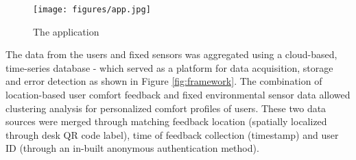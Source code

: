 \documentclass[]{interact}
\theoremstyle{plain}%
\theoremstyle{definition}
\theoremstyle{remark}
\begin{document}
\begin{figure}
\centering
\texttt{[image: figures/app.jpg]}
\caption{The application} 
\label{app}
\end{figure}


The data from the users and fixed sensors was aggregated using a cloud-based, time-series database - which served as a platform for data acquisition, storage and error detection as shown in Figure \ref{fig:framework}. The combination of location-based user comfort feedback and fixed environmental sensor data allowed clustering analysis for personalized comfort profiles of users. These two data sources were merged through matching feedback location (spatially localized through desk QR code label), time of feedback collection (timestamp) and user ID (through an in-built anonymous authentication method).     








\end{document}
